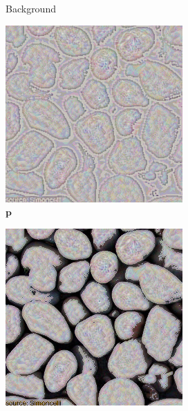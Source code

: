 \begin{figure}[]
\begin{subfigure}{\textwidth}
\begin{subfigure}{0.24\textwidth}
            \caption{Background}
            \label{fig:ex01-pebbles-5steps-threshold_bg}
        \end{subfigure}
        \hfill
        \begin{subfigure}{0.24\textwidth}
            \centering
            \includegraphics[width=\textwidth]{images/04-experiment01/pebbles/5/threshold_im.jpg}
            \caption{\(\bm{p}\)}
            \label{fig:ex01-pebbles-5steps-threshold_im}
        \end{subfigure}
        \hfill
        \begin{subfigure}{0.24\textwidth}
            \centering
            \includegraphics[width=\textwidth]{images/04-experiment01/pebbles/5/threshold_proj.jpg}

\end{subfigure}
\end{subfigure}
\end{figure}
